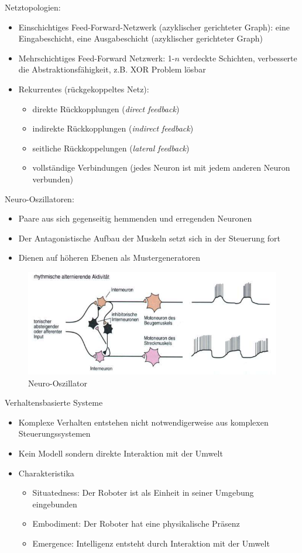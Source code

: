 Netztopologien:
\begin{itemize}
\item Einschichtiges Feed-Forward-Netzwerk (azyklischer gerichteter Graph): eine Eingabeschicht, eine Ausgabeschicht (azyklischer gerichteter Graph)
\item Mehrschichtiges Feed-Forward Netzwerk: 1-$n$ verdeckte Schichten, verbesserte die Abstraktionsfähigkeit, z.B. XOR Problem lösbar
\item Rekurrentes (rückgekoppeltes Netz):
\begin{itemize}
\item direkte Rückkopplungen (\textit{direct feedback})
\item indirekte Rückkopplungen (\textit{indirect feedback})
\item seitliche Rückkoppelungen (\textit{lateral feedback})
\item vollständige Verbindungen (jedes Neuron ist mit jedem anderen Neuron verbunden)
\end{itemize}
\end{itemize}
Neuro-Oszillatoren:
\begin{itemize}
\item Paare aus sich gegenseitig hemmenden und erregenden Neuronen
\item Der Antagonistische Aufbau der Muskeln setzt sich in der Steuerung fort
\item Dienen auf höheren Ebenen als Mustergeneratoren
\end{itemize}
\begin{figure}[h!]
	\centering
	\includegraphics[width=\textwidth]{figures/ch05_NeuroOs.png}
	\caption{Neuro-Oszillator}
\end{figure}
Verhaltensbasierte Systeme
\begin{itemize}
\item Komplexe Verhalten entstehen nicht notwendigerweise aus komplexen Steuerungssystemen
\item Kein Modell sondern direkte Interaktion mit der Umwelt
\item Charakteristika
\begin{itemize}
\item Situatedness: Der Roboter ist als Einheit in seiner Umgebung eingebunden
\item Embodiment: Der Roboter hat eine physikalische Präsenz
\item Emergence: Intelligenz entsteht durch Interaktion mit der Umwelt
\end{itemize}
\end{itemize}
